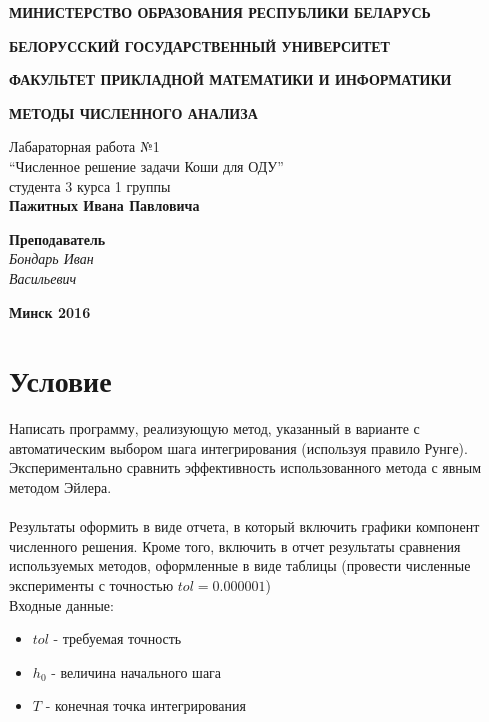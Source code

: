 \documentclass[oneside, final, 11pt]{article}
\begin{document}
\begin{titlepage}

\centerline{\large \bf МИНИСТЕРСТВО ОБРАЗОВАНИЯ РЕСПУБЛИКИ БЕЛАРУСЬ}
\bigskip
\bigskip
\centerline{\large \bf БЕЛОРУССКИЙ ГОСУДАРСТВЕННЫЙ УНИВЕРСИТЕТ}
\bigskip
\bigskip
\centerline{\large \bf ФАКУЛЬТЕТ ПРИКЛАДНОЙ МАТЕМАТИКИ И ИНФОРМАТИКИ}
\vfill
\vfill
\vfill
\centerline{\large \bf МЕТОДЫ ЧИСЛЕННОГО АНАЛИЗА}
\bigskip
\bigskip
\vfill
\begin{centering}
  \large Лабараторная работа №1 \\
 ``Численное решение задачи Коши для ОДУ'' \\
  студента 3 курса 1 группы \\
  \bf Пажитных Ивана Павловича \\
\end{centering}
\vfill
\vfill
\hfill
\begin{minipage}{0.25\textwidth}
  {\large{\bf Преподаватель} \\
{\it Бондарь Иван \\ Васильевич}}
\end{minipage}
\vfill
\vfill
\centerline{\large \bf Минск 2016}

\end{titlepage}

\restoregeometry

\section{Условие}
Написать программу, реализующую метод, указанный в варианте с автоматическим выбором шага интегрирования (используя правило Рунге). Экспериментально сравнить эффективность использованного метода с явным методом Эйлера.\\ \\
Результаты оформить в виде отчета, в который включить графики компонент численного решения. Кроме того, включить в отчет результаты сравнения используемых методов, оформленные в виде таблицы (провести численные эксперименты с точностью $tol = 0.000001$)\\

Входные данные:
\begin{itemize}
    \item $tol$ - требуемая точность
    \item $h_0$ - величина начального шага
    \item $T$ - конечная точка интегрирования
\end{itemize}
\end{document}
